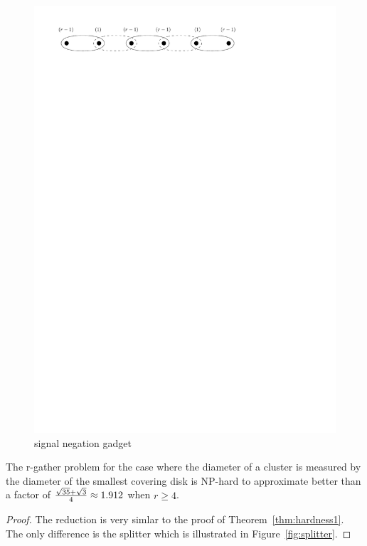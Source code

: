 \documentclass[11pt]{article}
\begin{document}
\begin{figure}[htbp]
\begin{center}
\includegraphics[scale=.8]{figs/negation}
\caption{signal negation gadget}
\label{fig:negation}
\end{center}
\end{figure}

\begin{theorem}
The r-gather problem for the case where the diameter of a cluster is measured by the diameter of the smallest covering disk is NP-hard to approximate better than a factor of ${\sqrt{35}+\sqrt{3} \over 4} \approx 1.912$ when $r\geq4$.
\end{theorem}
\begin{proof}
The reduction is very simlar to the proof of Theorem~\ref{thm:hardness1}.  The only difference is the splitter which is illustrated in Figure~\ref{fig:splitter}.
\end{proof}
\end{document}
